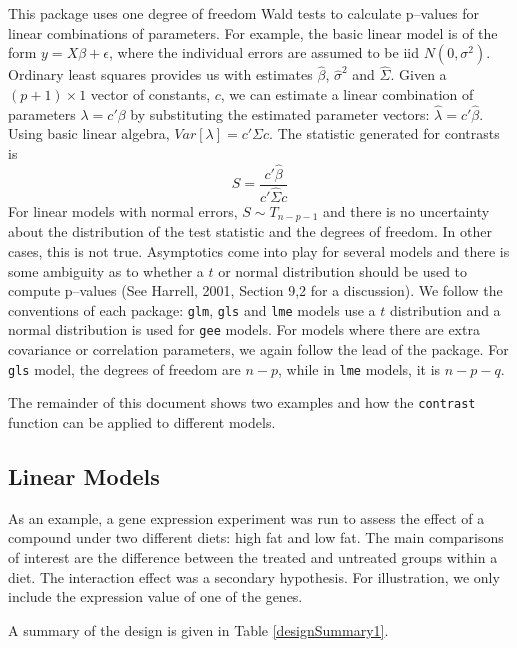 \documentclass[12pt]{article}
\begin{document}
This package uses one degree of freedom Wald tests to calculate p--values for linear combinations of parameters. For example, the basic linear model is of the form $y=X\beta+\epsilon$, where the individual errors are assumed to be iid $N(0, \sigma^2)$. Ordinary least squares provides us with estimates $\hat{\beta}$, $\hat{\sigma}^2$ and $\hat{\Sigma}$. Given a $(p+1)\times 1$ vector of constants, $c$, we can estimate a linear combination of parameters $\lambda = c'\beta$ by substituting the estimated parameter vectors: $\hat{\lambda} = c'\hat{\beta}$. Using basic linear algebra, $Var[\lambda] =  c'\Sigma c$. The statistic generated for contrasts is
\begin{equation}\label{E:Wald}
S = \frac{c'\hat{\beta}}{c'\hat{\Sigma} c} 
\end{equation}
For linear models with normal errors, $S\sim T_{n-p-1}$ and there is no uncertainty about the distribution of the test statistic and the degrees of freedom. In other cases, this is not true. Asymptotics come into play for several models and there is some ambiguity as to whether a $t$ or normal distribution should be used to compute p--values (See Harrell, 2001, Section 9,2 for a discussion). We follow the conventions of each package: \texttt{glm}, \texttt{gls} and \texttt{lme} models use a $t$ distribution and a normal distribution is used for \texttt{gee} models. For models where there are extra covariance or correlation parameters, we again follow the lead of the package. For \texttt{gls} model, the degrees of freedom are $n-p$, while in \texttt{lme} models, it is $n-p-q$.

The remainder of this document shows two examples and how the \texttt{contrast} function can be applied to different models.

\subsection{Linear Models}
 


As an example, a gene expression experiment was run to assess the effect of a compound under two different diets: high fat and low fat. The main comparisons of interest are the difference between the treated and untreated groups within a diet. The interaction effect was a secondary hypothesis. For illustration, we only include the expression value of one of the genes.

A summary of the design is given in Table \ref{designSummary1}.
\end{document}
